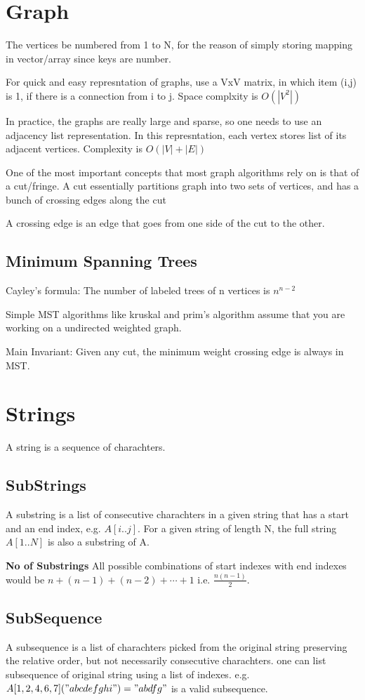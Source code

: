 \documentclass[10pt,a4paper]{article}
\begin{document}
	\section{Graph}
	
	The vertices be numbered from 1 to N, for the reason of simply storing mapping in vector/array since keys are number.
	
	For quick and easy represntation of graphs, use a VxV matrix, in which item (i,j) is 1, if there is a connection from i to j. Space complxity is $O(|V^{2}|)$
	
	In practice, the graphs are really large and sparse, so one needs to use an adjacency list representation. In this represntation, each vertex stores list of its adjacent vertices. Complexity is $O(|V| + |E|)$
	
	One of the most important concepts that most graph algorithms rely on is that of a cut/fringe. A cut essentially partitions graph into two sets of vertices, and has a bunch of crossing edges along the cut
	
	A crossing edge is an edge that goes from one side of the cut to the other.
	
	\subsection{Minimum Spanning Trees}
	
	Cayley's formula: The number of labeled trees of n vertices is $n^{n-2}$
	
	Simple MST algorithms like kruskal and prim's algorithm assume that you are working on a undirected weighted graph. 
	
	Main Invariant: Given any cut, the minimum weight crossing edge is always in MST.

	\section{Strings}
	A string is a sequence of charachters.
	
	\subsection{SubStrings}
	A substring is a list of consecutive charachters in a given string that has a start and an end index, e.g. $A[i..j]$. For a given string of length N, the full string $A[1..N]$ is also a substring of A.

	\textbf{No of Substrings} All possible combinations of start indexes with end indexes would be $n + (n - 1) + (n - 2) + \cdots + 1$ i.e. $\frac{n (n - 1)}{2}$.	
	
	\subsection{SubSequence}
	A subsequence is a list of charachters picked from the original string preserving the relative order, but not necessarily consecutive charachters.
	one can list subsequence of original string using a list of indexes. e.g.
	$A[1,2,4,6,7] ("abcdefghi") = "abdfg"$ is a valid subsequence.
\end{document}
